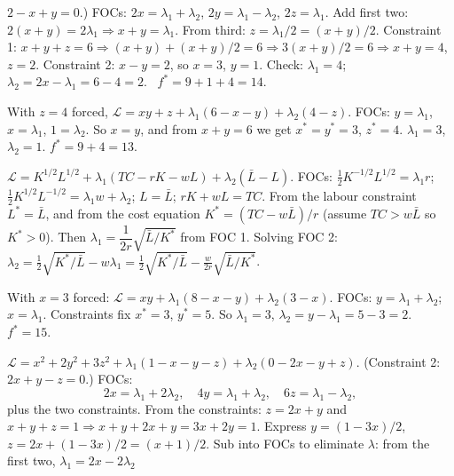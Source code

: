 \begin{solutions}
        $2 - x + y = 0$.) FOCs: $2 x = \lambda_1 + \lambda_2$,
        $2 y = \lambda_1 - \lambda_2$, $2 z = \lambda_1$. Add first two:
        $2(x + y) = 2 \lambda_1 \Rightarrow x + y = \lambda_1$. From
        third: $z = \lambda_1/2 = (x + y)/2$. Constraint 1:
        $x + y + z = 6 \Rightarrow (x + y) + (x + y)/2 = 6 \Rightarrow
        3(x + y)/2 = 6 \Rightarrow x + y = 4$, $z = 2$. Constraint 2:
        $x - y = 2$, so $x = 3$, $y = 1$. Check: $\lambda_1 = 4$;
        $\lambda_2 = 2 x - \lambda_1 = 6 - 4 = 2$. \checkmark\
        $f^* = 9 + 1 + 4 = 14$.
  \item With $z = 4$ forced, $\mathcal{L} = x y + z
        + \lambda_1(6 - x - y) + \lambda_2(4 - z)$. FOCs:
        $y = \lambda_1$, $x = \lambda_1$, $1 = \lambda_2$. So $x = y$,
        and from $x + y = 6$ we get $x^* = y^* = 3$, $z^* = 4$.
        $\lambda_1 = 3$, $\lambda_2 = 1$. $f^* = 9 + 4 = 13$.
  \item $\mathcal{L} = K^{1/2} L^{1/2} + \lambda_1(TC - r K - w L)
        + \lambda_2(\bar{L} - L)$. FOCs:
        $\tfrac{1}{2} K^{-1/2} L^{1/2} = \lambda_1 r$;
        $\tfrac{1}{2} K^{1/2} L^{-1/2} = \lambda_1 w + \lambda_2$;
        $L = \bar{L}$; $r K + w L = TC$. From the labour constraint
        $L^* = \bar{L}$, and from the cost equation
        $K^* = (TC - w \bar{L})/r$ (assume $TC > w \bar{L}$ so
        $K^* > 0$). Then
        $\lambda_1 = \dfrac{1}{2 r}\sqrt{\bar{L}/K^*}$ from FOC 1.
        Solving FOC 2:
        $\lambda_2 = \tfrac{1}{2} \sqrt{K^*/\bar{L}} - w \lambda_1
        = \tfrac{1}{2}\sqrt{K^*/\bar{L}}
        - \tfrac{w}{2 r}\sqrt{\bar{L}/K^*}$.
  \item With $x = 3$ forced: $\mathcal{L} = x y + \lambda_1(8 - x - y)
        + \lambda_2(3 - x)$. FOCs: $y = \lambda_1 + \lambda_2$;
        $x = \lambda_1$. Constraints fix $x^* = 3$, $y^* = 5$. So
        $\lambda_1 = 3$, $\lambda_2 = y - \lambda_1 = 5 - 3 = 2$.
        $f^* = 15$.
  \item $\mathcal{L} = x^2 + 2 y^2 + 3 z^2 + \lambda_1(1 - x - y - z)
        + \lambda_2(0 - 2 x - y + z)$. (Constraint 2:
        $2 x + y - z = 0$.) FOCs:
        \[
        2 x = \lambda_1 + 2 \lambda_2, \quad
        4 y = \lambda_1 + \lambda_2, \quad
        6 z = \lambda_1 - \lambda_2,
        \]
        plus the two constraints. From the constraints: $z = 2 x + y$ and
        $x + y + z = 1 \Rightarrow x + y + 2 x + y = 3 x + 2 y = 1$.
        Express $y = (1 - 3 x)/2$,
        $z = 2 x + (1 - 3 x)/2 = (x + 1)/2$. Sub into FOCs to eliminate
        $\lambda$: from the first two, $\lambda_1 = 2 x - 2 \lambda_2$

\end{solutions}
